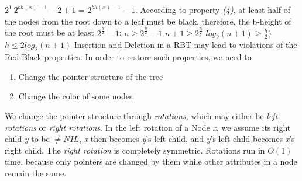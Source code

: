 \documentclass[14pt]{article}
\begin{document}
$2^1 \ 2^{bh(x) - 1} - 2 + 1$ = $2^{bh(x) - 1}- 1$. \newline \newline
According to property \textit{(4)}, at least half of the nodes from the root down to a leaf must be black,
therefore, the b-height of the root must be at least $2^{\frac{h}{2}} - 1$: \newline
$n \geq 2^{\frac{h}{2}} - 1$ \newline \newline
$n + 1 \geq 2^{\frac{h}{2}}$ \newline \newline
$log_2(n + 1) \geq \frac{h}{2})$ \newline \newline
\textbf{$h \leq 2 log_2(n + 1)$} \newline \newline \newline
Insertion and Deletion in a RBT may lead to violations of the Red-Black properties. \newline
In order to restore such properties, we need to
    \begin{enumerate}
        \item Change the pointer structure of the tree
        \item Change the color of some nodes
    \end{enumerate}
We change the pointer structure through \textit{rotations}, which may either be \textit{left rotations}
    or \textit{right rotations}. \newline
In the left rotation of a Node \textit{x}, we assume its right child \textit{y} to be $\neq NIL$, \textit{x} then
    becomes \textit{y}'s left child, and \textit{y}'s left child becomes \textit{x}'s right child. \newline
    The \textit{right rotation} is completely symmetric. \newline
Rotations run in $O(1)$ time, because only pointers are changed by them while other attributes in a node
    remain the same. \newline
\end{document}
